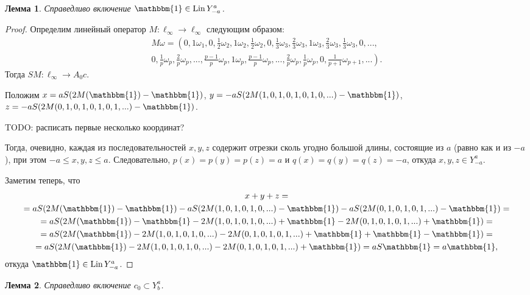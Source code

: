 \documentclass[a4paper,14pt]{article} %
\theoremstyle{plain}
\newtheorem{lemma}{Лемма}[section]
\begin{document}
\begin{lemma}
	\label{lem:const_Lin_alpha_0_a_eq_-b}
	Справедливо включение
	$\mathbbm{1}\in \operatorname{Lin} Y^a_{-a}$.
\end{lemma}

\begin{proof}
	Определим линейный оператор $M:\ell_\infty \to \ell_\infty$ следующим образом:
	\begin{multline}
		M\omega=\left(
			0, 1\omega_1,
			0, \frac{1}{2}\omega_2, 1\omega_2, \frac{1}{2}\omega_2,
			0, \frac{1}{3}\omega_3, \frac{2}{3}\omega_3, 1\omega_3, \frac{2}{3}\omega_3, \frac{1}{3}\omega_3,
			0, ...,
		\right. \\ \left.
			0, \frac{1}{p}\omega_p, \frac{2}{p}\omega_p, ..., \frac{p-1}{p}\omega_p, 1\omega_p,
				\frac{p-1}{p}\omega_p, ..., \frac{2}{p}\omega_p, \frac{1}{p}\omega_p,
			0, \frac{1}{p+1}\omega_{p+1}, ...
		\right)
		.
	\end{multline}
	Тогда $SM: \ell_\infty \to A_0 c$.

	Положим $x=aS(2M(\mathbbm{1})-\mathbbm{1})$,
	$y=-aS(2M(1,0,1,0,1,0,1,0,...)-\mathbbm{1})$,
	$z=-aS(2M(0,1,0,1,0,1,0,1,...)-\mathbbm{1})$.

	TODO: расписать первые несколько координат?

	Тогда, очевидно, каждая из последовательностей $x,y,z$ содержит отрезки сколь угодно большой длины,
	состоящие из $a$ (равно как и из $-a$), при этом $-a \leq x,y,z \leq a$.
	Следовательно, $p(x)=p(y)=p(z) = a$ и $q(x)=q(y)=q(z) = -a$,
	откуда $x,y,z \in Y^a_{-a}$.

	Заметим теперь, что
	\begin{multline}
		x + y + z
		=
		\\=
		aS(2M(\mathbbm{1})-\mathbbm{1}) - aS(2M(1,0,1,0,1,0,...)-\mathbbm{1}) - aS(2M(0,1,0,1,0,1,...)-\mathbbm{1})
		=
		\\=
		aS(2M(\mathbbm{1})-\mathbbm{1}  -    2M(1,0,1,0,1,0,...)+\mathbbm{1}  -    2M(0,1,0,1,0,1,...)+\mathbbm{1})
		=
		\\=
		aS(2M(\mathbbm{1}) - 2M(1,0,1,0,1,0,...) - 2M(0,1,0,1,0,1,...)+\mathbbm{1}+\mathbbm{1}-\mathbbm{1})
		=
		\\=
		aS(2M(\mathbbm{1}) - 2M(1,0,1,0,1,0,...) - 2M(0,1,0,1,0,1,...)+\mathbbm{1})
		=
		aS\mathbbm{1}
		=
		a\mathbbm{1}
		,
	\end{multline}
	откуда $\mathbbm{1} \in \operatorname{Lin} Y^a_{-a}$.
\end{proof}


\begin{lemma}
	\label{lem:c_0_Lin_alpha_0}
	Справедливо включение $c_0 \subset Y^a_b$.
\end{lemma}
\end{document}
